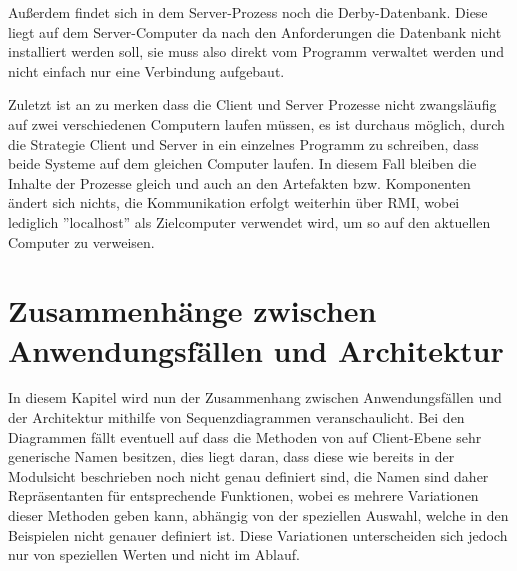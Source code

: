 \documentclass[fontsize=12pt,paper=a4,twoside]{scrartcl}
\begin{document}
Außerdem findet sich in dem Server-Prozess noch die Derby-Datenbank. Diese liegt auf dem Server-Computer da nach den Anforderungen die Datenbank nicht installiert werden soll, sie muss also direkt vom Programm verwaltet werden und nicht einfach nur eine Verbindung aufgebaut.

Zuletzt ist an zu merken dass die Client und Server Prozesse nicht zwangsläufig auf zwei verschiedenen Computern laufen müssen, es ist durchaus möglich, durch die Strategie Client und Server in ein einzelnes Programm zu schreiben, dass beide Systeme auf dem gleichen Computer laufen. In diesem Fall bleiben die Inhalte der Prozesse gleich und auch an den Artefakten bzw. Komponenten ändert sich nichts, die Kommunikation erfolgt weiterhin über RMI, wobei lediglich ''localhost'' als Zielcomputer verwendet wird, um so auf den aktuellen Computer zu verweisen.


\section[Zusammenhänge zwischen Anwendungsfällen und Architektur]{Zusammenhänge zwischen Anwendungsfällen und Architektur}
\label{sec:anwendungsfaelle}

In diesem Kapitel wird nun der Zusammenhang zwischen Anwendungsfällen und der Architektur mithilfe von Sequenzdiagrammen veranschaulicht. Bei den Diagrammen fällt eventuell auf dass die Methoden von auf Client-Ebene sehr generische Namen besitzen, dies liegt daran, dass diese wie bereits in der Modulsicht beschrieben noch nicht genau definiert sind, die Namen sind daher Repräsentanten für entsprechende Funktionen, wobei es mehrere Variationen dieser Methoden geben kann, abhängig von der speziellen Auswahl, welche in den Beispielen nicht genauer definiert ist. Diese Variationen unterscheiden sich jedoch nur von speziellen Werten und nicht im Ablauf.
\end{document}
